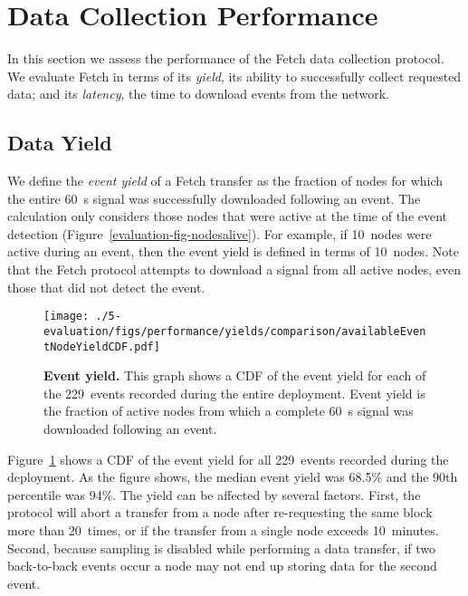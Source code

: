 \section{Data Collection Performance}
\label{evaluation-sec-performance}

In this section we assess the performance of the Fetch data collection
protocol. We evaluate Fetch in terms of its \textit{yield}, its ability to
successfully collect requested data; and its \textit{latency}, the time to
download events from the network.

\subsection{Data Yield}

We define the \textit{event yield} of a Fetch transfer as the fraction of
nodes for which the entire 60~s signal was successfully downloaded following
an event. The calculation only considers those nodes that were active at the
time of the event detection (Figure~\ref{evaluation-fig-nodesalive}). For
example, if 10~nodes were active during an event, then the event yield is
defined in terms of 10~nodes. Note that the Fetch protocol attempts to
download a signal from all active nodes, even those that did not detect the
event.

\begin{figure}[t]
\begin{center}
\texttt{[image: ./5-evaluation/figs/performance/yields/comparison/availableEventNodeYieldCDF.pdf]}
\end{center}
\caption{\textbf{Event yield.}
This graph shows a CDF of the event yield for each of the 229~events recorded
during the entire deployment. Event yield is the fraction of active nodes
from which a complete 60~s signal was downloaded following an event.}
\label{evaluation-fig-compBlockYieldCDF}
\end{figure}

Figure~\ref{evaluation-fig-compBlockYieldCDF} shows a CDF of the event yield
for all 229~events recorded during the deployment. As the figure shows, the
median event yield was 68.5\% and the 90th percentile was 94\%. The yield can
be affected by several factors. First, the protocol will abort a transfer
from a node after re-requesting the same block more than 20~times, or if the
transfer from a single node exceeds 10~minutes. Second, because sampling is
disabled while performing a data transfer, if two back-to-back events occur a
node may not end up storing data for the second event.

